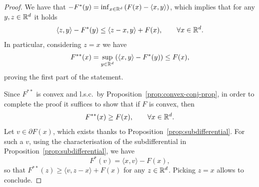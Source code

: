 \begin{proof}
     We have that $-F^*(y)=\inf_{x\in\mathbb{R}^d} \left(F(x)-\langle x,y\rangle\right)$, which implies that for any $y,z\in\mathbb{R}^d$ it holds
     \begin{equation}
         \langle z,y\rangle - F^*(y) \le \langle z-x,y\rangle +F(x), \qquad \forall x\in\mathbb{R}^d.
     \end{equation}
     In particular, considering $z=x$ we have
     \begin{equation}
         F^{**}(x) = \sup_{y\in\mathbb{R}^d} \left(\langle x,y\rangle - F^*(y)\right) \le F(x),
     \end{equation}
     proving the first part of the statement.
 
     Since $F^{**}$ is convex and l.s.c.~by Proposition~\ref{prop:convex-conj-prop}, in order to complete the proof it suffices to show that if $F$ is convex, then
     \begin{equation}
         F^{**}(x)\ge F(x),\qquad \forall x\in\mathbb{R}^d.
     \end{equation}
     Let $v\in \partial F(x)$, which exists thanks to Proposition~\ref{prop:subdifferential}. For such a $v$, using the characterisation of the subdifferential in Proposition~\ref{prop:subdifferential}, we have
     \begin{equation}
         F^*(v)=\langle x,v\rangle - F(x),
     \end{equation}
     so that $F^{**}(z)\ge \langle v,z-x\rangle+F(x)$ for any $z\in \mathbb{R}^d$. Picking $z=x$ allows to conclude.
 \end{proof}
 
 
 
 
